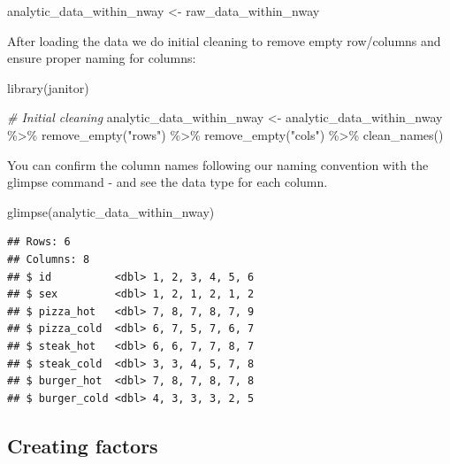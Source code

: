 \documentclass[
]{krantz}
\makeatletter
\newenvironment{Shaded}{\begin{snugshade}}{\end{snugshade}}
\newcommand{\CommentTok}[1]{\textcolor[rgb]{0.37,0.37,0.37}{\textit{#1}}}
\newcommand{\FunctionTok}[1]{\textcolor[rgb]{0,0,0}{#1}}
\newcommand{\NormalTok}[1]{#1}
\newcommand{\OtherTok}[1]{\textcolor[rgb]{0.37,0.37,0.37}{#1}}
\newcommand{\SpecialCharTok}[1]{\textcolor[rgb]{0,0,0}{#1}}
\newcommand{\StringTok}[1]{\textcolor[rgb]{0.5,0.5,0.5}{#1}}
\newenvironment{kframe}{%
\medskip{}
\setlength{\fboxsep}{.8em}
 \def\at@end@of@kframe{}%
 \ifinner\ifhmode%
  \def\at@end@of@kframe{\end{minipage}}%
  \begin{minipage}{\columnwidth}%
 \fi\fi%
 \def\FrameCommand##1{\hskip\@totalleftmargin \hskip-\fboxsep
 \colorbox{shadecolor}{##1}\hskip-\fboxsep
     \hskip-\linewidth \hskip-\@totalleftmargin \hskip\columnwidth}%
 \MakeFramed {\advance\hsize-\width
   \@totalleftmargin\z@ \linewidth\hsize
   \@setminipage}}%
 {\par\unskip\endMakeFramed%
 \at@end@of@kframe}
\renewenvironment{Shaded}{\begin{kframe}}{\end{kframe}}
\makeatother
\begin{document}
\begin{Shaded}
\begin{Highlighting}[]
\NormalTok{analytic\_data\_within\_nway }\OtherTok{\textless{}{-}}\NormalTok{ raw\_data\_within\_nway}
\end{Highlighting}
\end{Shaded}

After loading the data we do initial cleaning to remove empty row/columns and ensure proper naming for columns:

\begin{Shaded}
\begin{Highlighting}[]
\FunctionTok{library}\NormalTok{(janitor)}

\CommentTok{\# Initial cleaning}
\NormalTok{analytic\_data\_within\_nway }\OtherTok{\textless{}{-}}\NormalTok{ analytic\_data\_within\_nway }\SpecialCharTok{\%\textgreater{}\%}
  \FunctionTok{remove\_empty}\NormalTok{(}\StringTok{"rows"}\NormalTok{) }\SpecialCharTok{\%\textgreater{}\%}
  \FunctionTok{remove\_empty}\NormalTok{(}\StringTok{"cols"}\NormalTok{) }\SpecialCharTok{\%\textgreater{}\%}
  \FunctionTok{clean\_names}\NormalTok{()}
\end{Highlighting}
\end{Shaded}

You can confirm the column names following our naming convention with the glimpse command - and see the data type for each column.

\begin{Shaded}
\begin{Highlighting}[]
\FunctionTok{glimpse}\NormalTok{(analytic\_data\_within\_nway)}
\end{Highlighting}
\end{Shaded}

\begin{verbatim}
## Rows: 6
## Columns: 8
## $ id          <dbl> 1, 2, 3, 4, 5, 6
## $ sex         <dbl> 1, 2, 1, 2, 1, 2
## $ pizza_hot   <dbl> 7, 8, 7, 8, 7, 9
## $ pizza_cold  <dbl> 6, 7, 5, 7, 6, 7
## $ steak_hot   <dbl> 6, 6, 7, 7, 8, 7
## $ steak_cold  <dbl> 3, 3, 4, 5, 7, 8
## $ burger_hot  <dbl> 7, 8, 7, 8, 7, 8
## $ burger_cold <dbl> 4, 3, 3, 3, 2, 5
\end{verbatim}

\hypertarget{creating-factors-2}{%
\subsection{Creating factors}\label{creating-factors-2}}
\end{document}
